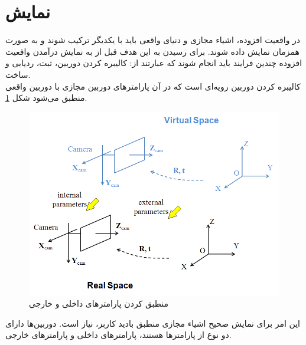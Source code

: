 \section{نمایش}
در واقعیت افزوده، اشیاء مجازی و دنیای واقعی باید با یکدیگر ترکیب شوند و به صورت همزمان نمایش داده
شوند. برای رسیدن به این هدف قبل از به نمایش درآمدن واقعیت افزوده چندین فرایند باید انجام شوند که
عبارتند از: کالیبره کردن دوربین، ثبت، ردیابی و ساخت.
\\
کالیبره کردن دوربین رویه‌ای است که در آن پارامترهای دوربین مجازی با دوربین واقعی منطبق می‌شود شکل \ref{fig:Billinghurst}. 

\begin{figure}
	\centering
	\includegraphics[width=1\linewidth]{image/realspace}
	\caption {منطبق کردن پارامترهای داخلی و خارجی \cite{Billinghurst}}
	\label{fig:Billinghurst}
\end{figure}

این امر برای نمایش صحیح اشیاء مجازی منطبق بادید کاربر، نیاز است. دوربین‌ها دارای دو نوع از پارامترها هستند، پارامترهای داخلی و پارامترهای خارجی. 

